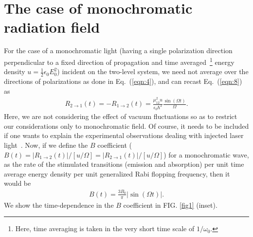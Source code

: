 \documentclass[aps,pra,twocolumn,showpacs,preprintnumbers,amsmath,amssymb,footinbib]{revtex4}
\begin{document}
\section{The case of monochromatic radiation field}
For the case of a monochromatic light (having a single polarization direction perpendicular to a fixed direction of propagation and time averaged~\footnote{Here, time averaging is taken in the very short time scale of $1/\omega_0$.} energy density $u=\frac{1}{2}\epsilon_0E_0^2$) incident on the two-level system, we need not average over the directions of polarizations as done in Eq.~(\ref{eqn:4}), and can recast Eq.~(\ref{eqn:8}) as
\begin{eqnarray}\label{eqn:9a}
R_{2\rightarrow1}(t)=-R_{1\rightarrow2}(t)=\frac{\mu_{12}^2u}{\epsilon_0\hbar^2}\frac{\sin(\Omega t)}{\Omega}.
\end{eqnarray}
Here, we are not considering the effect of vacuum fluctuations so as to restrict our considerations only to monochromatic field. Of course, it needs to be included if one wants to explain the experimental observations dealing with injected laser light~\cite{Brune,Meekhof}. Now, if we define the $B$ coefficient ($B(t)=|R_{1\rightarrow2}(t)|/[u/\Omega]=|R_{2\rightarrow1}(t)|/[u/\Omega]$) for a monochromatic wave, as the rate of the stimulated transitions (emission and absorption) per unit time average energy density per unit generalized Rabi flopping frequency, then it would be
\begin{eqnarray}\label{eqn:9b}
B(t)=\frac{3B_0}{\pi}|\sin(\Omega t)|.
\end{eqnarray}
We show the time-dependence in the $B$ coefficient in FIG. \ref{fig1} (inset). 
\end{document}
